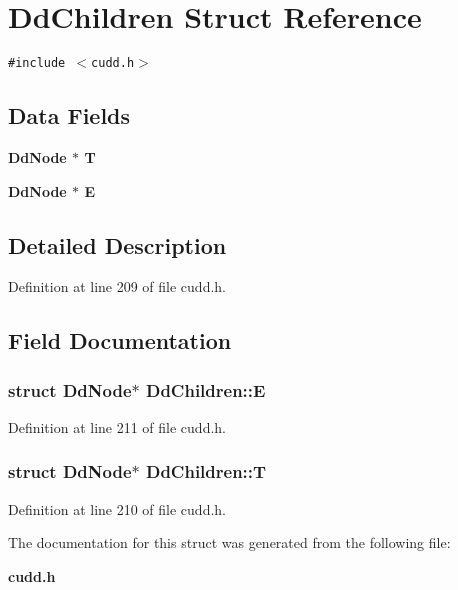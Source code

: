 \section{Dd\-Children Struct Reference}
\label{structDdChildren}
{\tt \#include $<$cudd.h$>$}

\subsection*{Data Fields}
\begin{CompactItemize}
\item 
\bf{Dd\-Node} $\ast$ \bf{T}
\item 
\bf{Dd\-Node} $\ast$ \bf{E}
\end{CompactItemize}


\subsection{Detailed Description}




Definition at line 209 of file cudd.h.

\subsection{Field Documentation}
\subsubsection{\setlength{\rightskip}{0pt plus 5cm}struct \bf{Dd\-Node}$\ast$ \bf{Dd\-Children::E}}\label{structDdChildren_edecad6f1bca3d6b46c71b0a011e51c5}




Definition at line 211 of file cudd.h.
\subsubsection{\setlength{\rightskip}{0pt plus 5cm}struct \bf{Dd\-Node}$\ast$ \bf{Dd\-Children::T}}\label{structDdChildren_d0ae5b8d618066932517a85d2286319f}




Definition at line 210 of file cudd.h.

The documentation for this struct was generated from the following file:\begin{CompactItemize}
\item 
\bf{cudd.h}\end{CompactItemize}
